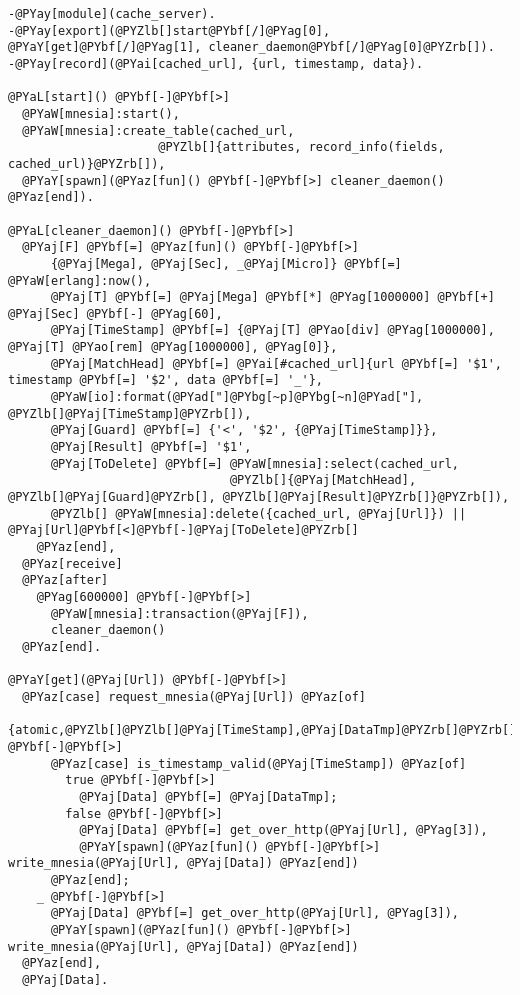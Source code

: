 \begin{Verbatim}[commandchars=@\[\]]
-@PYay[module](cache_server).
-@PYay[export](@PYZlb[]start@PYbf[/]@PYag[0], @PYaY[get]@PYbf[/]@PYag[1], cleaner_daemon@PYbf[/]@PYag[0]@PYZrb[]).
-@PYay[record](@PYai[cached_url], {url, timestamp, data}).

@PYaL[start]() @PYbf[-]@PYbf[>]
  @PYaW[mnesia]:start(),
  @PYaW[mnesia]:create_table(cached_url, 
                     @PYZlb[]{attributes, record_info(fields, cached_url)}@PYZrb[]),
  @PYaY[spawn](@PYaz[fun]() @PYbf[-]@PYbf[>] cleaner_daemon() @PYaz[end]).

@PYaL[cleaner_daemon]() @PYbf[-]@PYbf[>]
  @PYaj[F] @PYbf[=] @PYaz[fun]() @PYbf[-]@PYbf[>]
      {@PYaj[Mega], @PYaj[Sec], _@PYaj[Micro]} @PYbf[=] @PYaW[erlang]:now(),
      @PYaj[T] @PYbf[=] @PYaj[Mega] @PYbf[*] @PYag[1000000] @PYbf[+] @PYaj[Sec] @PYbf[-] @PYag[60],
      @PYaj[TimeStamp] @PYbf[=] {@PYaj[T] @PYao[div] @PYag[1000000], @PYaj[T] @PYao[rem] @PYag[1000000], @PYag[0]},
      @PYaj[MatchHead] @PYbf[=] @PYai[#cached_url]{url @PYbf[=] '$1', timestamp @PYbf[=] '$2', data @PYbf[=] '_'},
      @PYaW[io]:format(@PYad["]@PYbg[~p]@PYbg[~n]@PYad["], @PYZlb[]@PYaj[TimeStamp]@PYZrb[]),
      @PYaj[Guard] @PYbf[=] {'<', '$2', {@PYaj[TimeStamp]}},
      @PYaj[Result] @PYbf[=] '$1',
      @PYaj[ToDelete] @PYbf[=] @PYaW[mnesia]:select(cached_url,
                               @PYZlb[]{@PYaj[MatchHead], @PYZlb[]@PYaj[Guard]@PYZrb[], @PYZlb[]@PYaj[Result]@PYZrb[]}@PYZrb[]),
      @PYZlb[] @PYaW[mnesia]:delete({cached_url, @PYaj[Url]}) || @PYaj[Url]@PYbf[<]@PYbf[-]@PYaj[ToDelete]@PYZrb[]
    @PYaz[end],
  @PYaz[receive]
  @PYaz[after]
    @PYag[600000] @PYbf[-]@PYbf[>]
      @PYaW[mnesia]:transaction(@PYaj[F]),
      cleaner_daemon()
  @PYaz[end].  

@PYaY[get](@PYaj[Url]) @PYbf[-]@PYbf[>]
  @PYaz[case] request_mnesia(@PYaj[Url]) @PYaz[of]
    {atomic,@PYZlb[]@PYZlb[]@PYaj[TimeStamp],@PYaj[DataTmp]@PYZrb[]@PYZrb[]} @PYbf[-]@PYbf[>]
      @PYaz[case] is_timestamp_valid(@PYaj[TimeStamp]) @PYaz[of]
        true @PYbf[-]@PYbf[>]
          @PYaj[Data] @PYbf[=] @PYaj[DataTmp];
        false @PYbf[-]@PYbf[>]
          @PYaj[Data] @PYbf[=] get_over_http(@PYaj[Url], @PYag[3]),
          @PYaY[spawn](@PYaz[fun]() @PYbf[-]@PYbf[>] write_mnesia(@PYaj[Url], @PYaj[Data]) @PYaz[end])
      @PYaz[end];
    _ @PYbf[-]@PYbf[>]
      @PYaj[Data] @PYbf[=] get_over_http(@PYaj[Url], @PYag[3]),
      @PYaY[spawn](@PYaz[fun]() @PYbf[-]@PYbf[>] write_mnesia(@PYaj[Url], @PYaj[Data]) @PYaz[end])
  @PYaz[end],
  @PYaj[Data].


\end{Verbatim}
